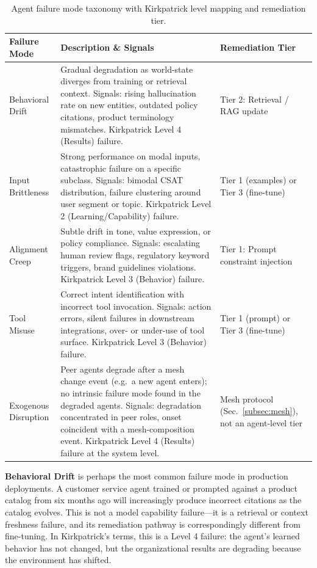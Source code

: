 \begin{table}[t]
  \centering
  \caption{Agent failure mode taxonomy with Kirkpatrick level mapping and
           remediation tier.}
  \label{tab:taxonomy}
  \footnotesize
  \begin{tabular}{@{}L{1.4cm}L{3.6cm}L{2.1cm}@{}}
    \toprule
    \textbf{Failure Mode} & \textbf{Description \& Signals} &
    \textbf{Remediation Tier} \\
    \midrule
    Behavioral Drift &
    Gradual degradation as world-state diverges from training or retrieval
    context. Signals: rising hallucination rate on new entities, outdated
    policy citations, product terminology mismatches. Kirkpatrick Level 4
    (Results) failure. &
    Tier 2: Retrieval / RAG update \\
    \addlinespace
    Input Brittleness &
    Strong performance on modal inputs, catastrophic failure on a specific
    subclass. Signals: bimodal CSAT distribution, failure clustering around
    user segment or topic. Kirkpatrick Level 2 (Learning/Capability) failure. &
    Tier 1 (examples) or Tier 3 (fine-tune) \\
    \addlinespace
    Alignment Creep &
    Subtle drift in tone, value expression, or policy compliance. Signals:
    escalating human review flags, regulatory keyword triggers, brand
    guidelines violations. Kirkpatrick Level 3 (Behavior) failure. &
    Tier 1: Prompt constraint injection \\
    \addlinespace
    Tool Misuse &
    Correct intent identification with incorrect tool invocation. Signals:
    action errors, silent failures in downstream integrations, over- or
    under-use of tool surface. Kirkpatrick Level 3 (Behavior) failure. &
    Tier 1 (prompt) or Tier 3 (fine-tune) \\
    \addlinespace
    Exogenous Disruption &
    Peer agents degrade after a mesh change event (e.g.\ a new agent enters);
    no intrinsic failure mode found in the degraded agents. Signals:
    degradation concentrated in peer roles, onset coincident with a
    mesh-composition event. Kirkpatrick Level 4 (Results) failure at the
    system level. &
    Mesh protocol (Sec.~\ref{subsec:mesh}), not an agent-level tier \\
    \bottomrule
  \end{tabular}
\end{table}

\textbf{Behavioral Drift} is perhaps the most common failure mode in production
deployments. A customer service agent trained or prompted against a product
catalog from six months ago will increasingly produce incorrect citations as
the catalog evolves. This is not a model capability failure---it is a retrieval
or context freshness failure, and its remediation pathway is correspondingly
different from fine-tuning. In Kirkpatrick's terms, this is a Level 4 failure:
the agent's learned behavior has not changed, but the organizational results
are degrading because the environment has shifted.

